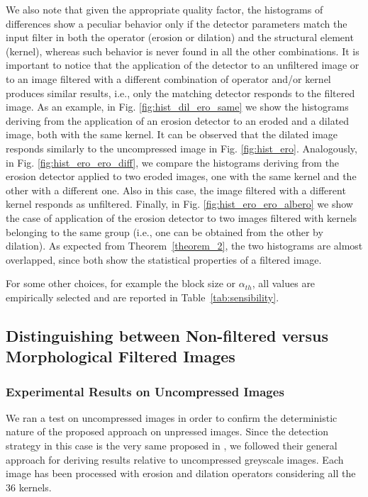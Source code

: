 \documentclass[review]{elsarticle}
\begin{document}
We also note that given the appropriate quality factor, the histograms of differences show a peculiar behavior only if the detector parameters match the input filter in both the operator (erosion or dilation) and the structural element (kernel), whereas such behavior is never found in all the other combinations. It is important to notice that the application of the detector to an unfiltered image or to an image filtered with a different combination of operator and/or kernel produces similar results, i.e., only the matching detector responds to the filtered image. As an example, in Fig. \ref{fig:hist_dil_ero_same} we show the histograms deriving from the application of an erosion detector to an eroded and a dilated image, both with the same kernel. It can be observed that the dilated image responds similarly to the uncompressed image in Fig. \ref{fig:hist_ero}. Analogously, in Fig. \ref{fig:hist_ero_ero_diff}, we compare the histograms deriving from the erosion detector applied to two eroded images, one with the same kernel and the other with a different one. Also in this case, the image filtered with a different kernel responds as unfiltered. Finally, in Fig. \ref{fig:hist_ero_ero_albero} we show the case of application of the erosion detector to two images filtered with kernels belonging to the same group (i.e., one can be obtained from the other by dilation). As expected from Theorem~\ref{theorem_2}, the two histograms are almost overlapped, since both show the statistical properties of a filtered image.

For some other choices, for example the block size or $\alpha_{th}$, all values are empirically selected and are reported in Table~\ref{tab:sensibility}. 

\subsection{Distinguishing between Non-filtered versus Morphological Filtered Images}
\label{sec:compr_res}

\subsubsection{Experimental Results on Uncompressed Images}

We ran a test on uncompressed images in order to confirm the deterministic nature of the proposed approach on unpressed images. Since the detection strategy in this case is the very same proposed in \cite{de2017detecting}, we followed their general approach for deriving results relative to uncompressed greyscale images. Each image has been processed with erosion and dilation operators considering all the 36 kernels.
\end{document}
